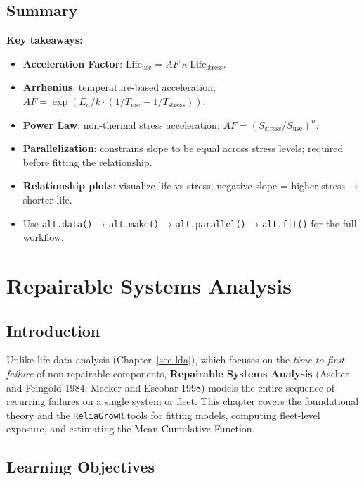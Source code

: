 \documentclass[
  letterpaper,
  DIV=11,
  numbers=noendperiod]{scrreprt}
\providecommand{\tightlist}{%
  \setlength{\itemsep}{0pt}\setlength{\parskip}{0pt}}
\begin{document}
\section{Summary}\label{summary-4}

\textbf{Key takeaways:}

\begin{itemize}
\tightlist
\item
  \textbf{Acceleration Factor}:
  \(\text{Life}_{\text{use}} = AF \times \text{Life}_{\text{stress}}\).
\item
  \textbf{Arrhenius}: temperature-based acceleration;
  \(AF = \exp(E_a/k \cdot (1/T_{\text{use}} - 1/T_{\text{stress}}))\).
\item
  \textbf{Power Law}: non-thermal stress acceleration;
  \(AF = (S_{\text{stress}}/S_{\text{use}})^n\).
\item
  \textbf{Parallelization}: constrains slope to be equal across stress
  levels; required before fitting the relationship.
\item
  \textbf{Relationship plots}: visualize life vs stress; negative slope
  = higher stress → shorter life.
\item
  Use \texttt{alt.data()} → \texttt{alt.make()} →
  \texttt{alt.parallel()} → \texttt{alt.fit()} for the full workflow.
\end{itemize}


\chapter{Repairable Systems Analysis}\label{sec-rs}

\section{Introduction}\label{introduction-5}

Unlike life data analysis (Chapter~\ref{sec-lda}), which focuses on the
\emph{time to first failure} of non-repairable components,
\textbf{Repairable Systems Analysis} (Ascher and Feingold 1984; Meeker
and Escobar 1998) models the entire sequence of recurring failures on a
single system or fleet. This chapter covers the foundational theory and
the \texttt{ReliaGrowR} tools for fitting models, computing fleet-level
exposure, and estimating the Mean Cumulative Function.

\section{Learning Objectives}\label{learning-objectives-5}
\end{document}
